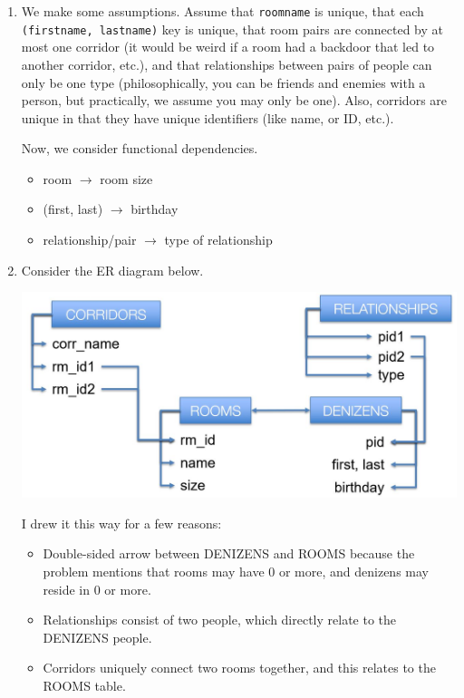 \documentclass{article}
\begin{document}
\begin{enumerate}[resume]
	
	\item We make some assumptions. Assume that \verb|roomname| is unique, that each \verb|(firstname, lastname)| key is unique, that room pairs are connected by at most one corridor (it would be weird if a room had a backdoor that led to another corridor, etc.), and that relationships between pairs of people can only be one type (philosophically, you can be friends and enemies with a person, but practically, we assume you may only be one). Also, corridors are unique in that they have unique identifiers (like name, or ID, etc.).

	Now, we consider functional dependencies.

	\begin{itemize}
		\item room $\rightarrow$ room size
		\item (first, last) $\rightarrow$ birthday
		\item relationship/pair $\rightarrow$ type of relationship
	\end{itemize}

	\item Consider the ER diagram below.

	\begin{center}\includegraphics[scale=0.35]{er_diagram.JPG}\end{center}

	I drew it this way for a few reasons:
	\begin{itemize}
		\item Double-sided arrow between DENIZENS and ROOMS because the problem mentions that rooms may have 0 or more, and denizens may reside in 0 or more.
		\item Relationships consist of two people, which directly relate to the DENIZENS people.
		\item Corridors uniquely connect two rooms together, and this relates to the ROOMS table.
	\end{itemize}


\end{enumerate}
\end{document}
